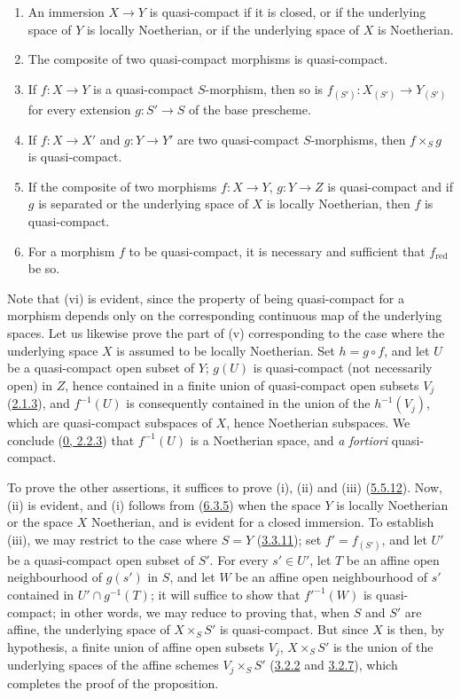 \begin{proposition}[6.6.4]
\label{I.6.6.4}
\begin{enumerate}
  \item[(i)] An immersion $X\to Y$ is quasi-compact if it is closed, or if the
    underlying space of $Y$ is locally Noetherian, or if the underlying space
    of $X$ is Noetherian.
  \item[(ii)] The composite of two quasi-compact morphisms is quasi-compact.
  \item[(iii)] If $f:X\to Y$ is a quasi-compact $S$-morphism, then so is
    $f_{(S')}:X_{(S')}\to Y_{(S')}$ for every extension $g:S'\to S$
    of the base prescheme.
  \item[(iv)] If $f:X\to X'$ and $g:Y\to Y'$ are two quasi-compact
    $S$-morphisms, then $f\times_S g$ is quasi-compact.
  \item[(v)] If the composite of two morphisms $f:X\to Y$, $g:Y\to Z$ is
    quasi-compact and if $g$ is separated or the underlying space of $X$ is
    locally Noetherian, then $f$ is quasi-compact.
  \item[(vi)] For a morphism $f$ to be quasi-compact, it is necessary and
    sufficient that $f_{\mathrm{red}}$ be so.
\end{enumerate}
\end{proposition}

Note that (vi) is evident, since the property of being quasi-compact for a
morphism depends only on the corresponding continuous map of the underlying
spaces. Let us likewise prove the part of (v) corresponding to the case where
the underlying space $X$ is assumed to be locally Noetherian. Set
$h=g\circ f$, and let $U$ be a quasi-compact open subset of $Y$; $g(U)$ is
quasi-compact (not necessarily open) in $Z$, hence contained in a finite union
of quasi-compact open subsets $V_j$
(\hyperref[I.2.1.3]{2.1.3}), and $f^{-1}(U)$ is consequently contained in
the union of the $h^{-1}(V_j)$, which are quasi-compact subspaces of $X$,
hence Noetherian subspaces. We conclude
(\hyperref[0.2.2.3]{0, 2.2.3}) that $f^{-1}(U)$ is a Noetherian space,
and \emph{a fortiori} quasi-compact.

To prove the other assertions, it suffices to prove (i), (ii) and (iii)
(\hyperref[I.5.5.12]{5.5.12}). Now, (ii) is evident, and (i) follows from
(\hyperref[I.6.3.5]{6.3.5}) when the space $Y$ is locally Noetherian
or the space $X$ Noetherian, and is evident for a closed immersion. To
establish (iii),
we may restrict to the case where $S=Y$ (\hyperref[I.3.3.11]{3.3.11}); set
$f'=f_{(S')}$, and let $U'$ be a quasi-compact open subset of $S'$. For every
$s'\in U'$, let $T$ be an affine open neighbourhood of $g(s')$ in $S$, and let
$W$ be an affine open neighbourhood of $s'$ contained in
$U'\cap g^{-1}(T)$; it will suffice to show that $f'^{-1}(W)$ is
quasi-compact; in other words, we may reduce to proving that, when $S$
and $S'$ are affine, the underlying space of $X\times_S S'$ is
quasi-compact. But since $X$ is then, by hypothesis, a finite union of affine
open subsets $V_j$, $X\times_S S'$ is the union of the underlying spaces of the
affine schemes $V_j\times_S S'$
(\hyperref[I.3.2.2]{3.2.2} and \hyperref[I.3.2.7]{3.2.7}), which
completes the proof of the proposition.

